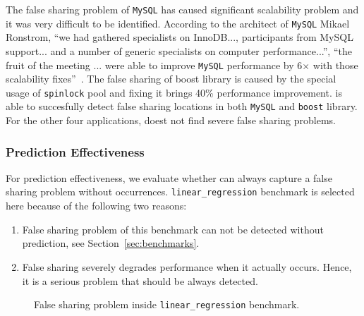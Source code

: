 The false sharing problem of \texttt{MySQL} has caused significant scalability problem and
it was very difficult to be identified. 
According to the architect of \texttt{MySQL} Mikael Ronstrom, ``we had gathered specialists on 
InnoDB..., participants from MySQL support... and a number of generic specialists on 
computer performance...'', ``the fruit of the meeting ... were able to 
improve \texttt{MySQL} performance by 6$\times$ with those scalability fixes''~\cite{mysql}. 
The false sharing of boost library is caused by the special usage of \texttt{spinlock} pool and fixing
it brings 40\% performance improvement. 
\Predator{} is able to succesfully detect false sharing locations
in both \texttt{MySQL} and \texttt{boost} library. 
For the other four applications, \Predator{} doest not find severe false sharing problems.

\subsubsection{Prediction Effectiveness}
\label{sec:predicteval}
For prediction effectiveness, we evaluate whether \Predator{} can always capture a false sharing
problem without occurrences.
\texttt{linear\_regression} benchmark is selected here because of the following two reasons:
\begin{enumerate}
\item
False sharing problem of this benchmark can not be detected without prediction, see Section~\ref{sec:benchmarks}. 

\item
False sharing severely degrades performance when it actually occurs. 
Hence, it is a serious problem that should be always detected. 
\end{enumerate}

\begin{figure}[!h]
{\centering
\subfigure{}
\caption{False sharing problem inside \texttt{linear\_regression} benchmark.
\label{fig:linearregression}}
}
\end{figure}


